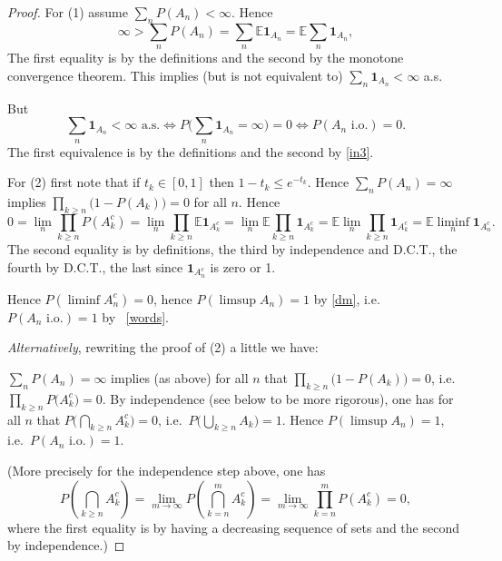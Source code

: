 \documentclass[a4paper]{amsart}
\theoremstyle{plain}
\theoremstyle{definition}
\theoremstyle{remark}
\begin{document}
\begin{proof}
  For (1) assume   $ \sum_n P(A_n) <\infty $. 
Hence
\[\infty > \sum_n P(A_n) = \sum_n \mathbb{E} \boldsymbol{1}_{A_n} 
    = \mathbb{E} \sum_n \boldsymbol{1}_{A_n},
    \]
The first equality is by the definitions and the second by the monotone convergence theorem.
This implies (but is not equivalent to) $      \sum_n \boldsymbol{1}_{A_n} < \infty $ a.s.

But
\[
  \sum_n \boldsymbol{1}_{A_n} < \infty  \text{ a.s.}
  \Longleftrightarrow   P\Big(  \sum_n \boldsymbol{1}_{A_n} = \infty \Big) = 0
  \Longleftrightarrow P(A_n \text{ i.o.}) = 0 .
  \]
The first equivalence   is by  the definitions and the second by
\eqref{in3}.

\medskip For (2) first note that if $ t_k \in [0,1] $ then $ 1 - t_k \leq e^{-t_k} $.  Hence 
$   \sum_n P(A_n) = \infty $ implies $ \prod_{k \geq n} \big( 1 - P(A_k) \big) = 0$ for all $ n $.
Hence
\[
0 = \lim_n \prod_{k \geq n}  P(A_k^c) 
= \lim_n \prod_{k \geq n}  \mathbb{E}  \boldsymbol{1}_{A_k^c}
=\lim_n \mathbb{E} \prod_{k \geq n}  \boldsymbol{1}_{A_k^c}
= \mathbb{E} \lim_n  \prod_{k \geq n} \boldsymbol{1}_{A_k^c}
= \mathbb{E} \liminf_n  \boldsymbol{1}_{A_n^c}.
 \]
The second equality is by definitions, the third by independence and D.C.T., the fourth by D.C.T., the last since 
$ \boldsymbol{1}_{A_n^c} $ is zero or 1. 

Hence $ P(\liminf   A_n^c  ) = 0 $, hence 
$ P(\limsup   A_n  ) = 1 $  by \eqref{dm}, i.e.\  $ P(A_n\text{ i.o.})= 1 $ by 
~\eqref{words}.


\medskip \noindent \emph{Alternatively}, rewriting the proof of (2) a little we have:

$   \sum_n P(A_n) = \infty $ implies (as above) for all $ n $ that $ \prod_{k \geq n} \big( 1 - P(A_k) \big) = 0$, i.e.\  $ \prod_{k \geq n}  P\big(A^c_k\big)  = 0$. 
By independence (see below to be more rigorous), one has for all $ n $ that  $ P \big( \bigcap_{k \geq n } A^c_k\big) = 0 $, i.e.\ $ P \big( \bigcup_{k \geq n } A_k\big) = 1 $.
Hence  $ P (\limsup A_n) = 1 $, i.e.\  $ P(A_n \text{ i.o.}) = 1 $. 

 (More precisely  for the independence step above, one has 
\[
P\left( \bigcap_{k\geq n} A^c_k \right) = \lim_{m\to \infty} P\left( \bigcap_{k= n}^m A^c_k \right)
  =  \lim_{m\to \infty} \prod_{k= n}^m P \left( A^c_k \right) =0 ,
\]
where the first equality is by having a decreasing sequence of sets and the second by independence.)
\end{proof} 
\end{document}
